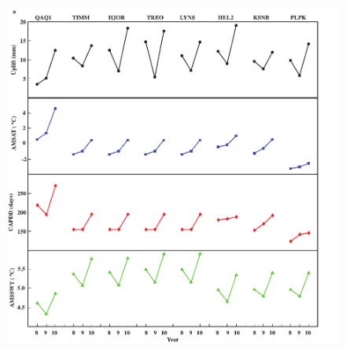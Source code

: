 \clearpage
\begin{figure}
 \centering
 \includegraphics{figs_chpt3/2012GC004432-p12a.pdf} 
\end{figure}

